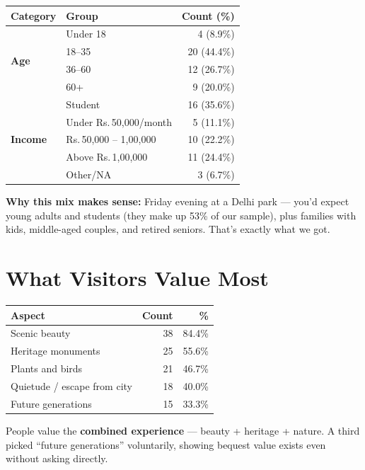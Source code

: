 \documentclass[11pt, a4paper]{article}
\newcommand{\rupee}{Rs.\,}
\begin{document}
\begin{table}[h]
\centering
\begin{tabular}{llr}
\toprule
\textbf{Category} & \textbf{Group} & \textbf{Count (\%)} \\
\midrule
\multirow{4}{*}{\textbf{Age}} & Under 18 & 4 (8.9\%) \\
 & 18--35 & 20 (44.4\%) \\
 & 36--60 & 12 (26.7\%) \\
 & 60+ & 9 (20.0\%) \\
\midrule
\multirow{5}{*}{\textbf{Income}} & Student & 16 (35.6\%) \\
 & Under \rupee 50,000/month & 5 (11.1\%) \\
 & \rupee 50,000 -- 1,00,000 & 10 (22.2\%) \\
 & Above \rupee 1,00,000 & 11 (24.4\%) \\
 & Other/NA & 3 (6.7\%) \\
\bottomrule
\end{tabular}
\end{table}

\textbf{Why this mix makes sense:} Friday evening at a Delhi park --- you'd expect young adults and students (they make up 53\% of our sample), plus families with kids, middle-aged couples, and retired seniors. That's exactly what we got.

\section{What Visitors Value Most}

\begin{table}[h]
\centering
\begin{tabular}{lrr}
\toprule
\textbf{Aspect} & \textbf{Count} & \textbf{\%} \\
\midrule
Scenic beauty & 38 & 84.4\% \\
Heritage monuments & 25 & 55.6\% \\
Plants and birds & 21 & 46.7\% \\
Quietude / escape from city & 18 & 40.0\% \\
Future generations & 15 & 33.3\% \\
\bottomrule
\end{tabular}
\end{table}

People value the \textbf{combined experience} --- beauty + heritage + nature. A third picked ``future generations'' voluntarily, showing bequest value exists even without asking directly.
\end{document}
